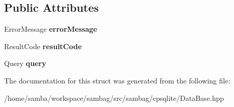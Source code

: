 \subsection*{Public Attributes}
\begin{DoxyCompactItemize}
\item 
\hypertarget{structsambag_1_1cpsqlite_1_1_data_base_query_failed_a0aa410921c0c8609bfffe8fcec23260e}{
ErrorMessage {\bfseries errorMessage}}
\label{structsambag_1_1cpsqlite_1_1_data_base_query_failed_a0aa410921c0c8609bfffe8fcec23260e}

\item 
\hypertarget{structsambag_1_1cpsqlite_1_1_data_base_query_failed_a131ba84c8139674f81f7a77f73bff87c}{
ResultCode {\bfseries resultCode}}
\label{structsambag_1_1cpsqlite_1_1_data_base_query_failed_a131ba84c8139674f81f7a77f73bff87c}

\item 
\hypertarget{structsambag_1_1cpsqlite_1_1_data_base_query_failed_add122bc0085c668d344a783e17b61321}{
Query {\bfseries query}}
\label{structsambag_1_1cpsqlite_1_1_data_base_query_failed_add122bc0085c668d344a783e17b61321}

\end{DoxyCompactItemize}


The documentation for this struct was generated from the following file:\begin{DoxyCompactItemize}
\item 
/home/samba/workspace/sambag/src/sambag/cpsqlite/DataBase.hpp\end{DoxyCompactItemize}
